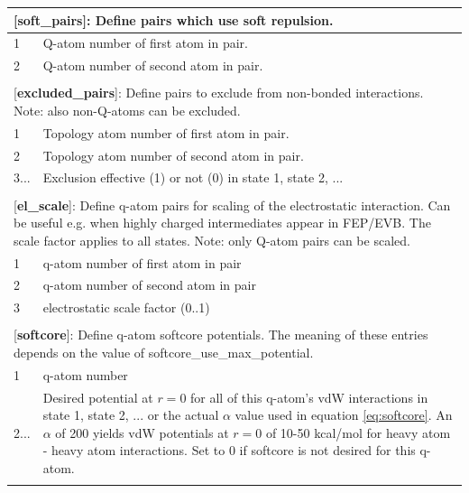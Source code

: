 \documentclass[a4paper,12pt]{article}
\begin{document}
\begin{longtable}{|p{53pt}|p{181pt}|p{160pt}|}
\multicolumn{3}{p{394pt}}{[\textbf{soft\_pairs}]: Define pairs which use soft repulsion.}\\
\hline 1 & \multicolumn{2}{p{341pt}|}{Q-atom number of first atom in pair.}\\
\hline 2 & \multicolumn{2}{p{341pt}|}{Q-atom number of second atom in pair.}\\
\hline
\multicolumn{3}{p{394pt}}{}\\

\multicolumn{3}{p{394pt}}{[\textbf{excluded\_pairs}]: Define pairs to exclude from non-bonded interactions. Note: also non-Q-atoms can be excluded.}\\
\hline 1 & \multicolumn{2}{p{341pt}|}{Topology atom number of first atom in pair.}\\
\hline 2 & \multicolumn{2}{p{341pt}|}{Topology atom number of second atom in pair.}\\
\hline 3... & \multicolumn{2}{p{341pt}|}{Exclusion effective (1) or not (0) in state 1, state 2, ...}\\
\hline
\multicolumn{3}{p{394pt}}{}\\

\multicolumn{3}{p{394pt}}{[\textbf{el\_scale}]: Define q-atom pairs for scaling of the electrostatic interaction. Can be useful e.g. when highly charged intermediates appear in FEP/EVB. The scale factor applies to all states. Note: only Q-atom pairs can be scaled.}\\
\hline 1 & \multicolumn{2}{p{341pt}|}{q-atom number of first atom in pair}\\
\hline 2 & \multicolumn{2}{p{341pt}|}{q-atom number of second atom in pair}\\
\hline 3 & \multicolumn{2}{p{341pt}|}{electrostatic scale factor (0..1)}\\
\hline
\multicolumn{3}{p{394pt}}{}\\

\multicolumn{3}{p{394pt}}{[\textbf{softcore}]: Define q-atom softcore potentials. The meaning of these entries depends on the value of softcore\-\_use\-\_max\-\_potential.}\\
\hline 1 & \multicolumn{2}{p{341pt}|}{q-atom number}\\
\hline 2... & \multicolumn{2}{p{341pt}|}{Desired potential at $r=0$ for all of this q-atom's vdW interactions in state 1, state 2, ... or the actual $\alpha$ value used in equation \ref{eq:softcore}. An $\alpha$ of 200 yields vdW potentials at $r=0$ of 10-50 kcal/mol for heavy atom - heavy atom interactions. Set to 0 if softcore is not desired for this q-atom. }\\
\hline
\multicolumn{3}{p{394pt}}{}\\


\end{longtable}
\end{document}
